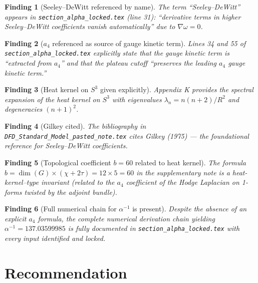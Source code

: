 \documentclass[11pt,a4paper]{article}
\newtheorem{finding}{Finding}
\begin{document}
\begin{finding}[Seeley--DeWitt referenced by name]
The term ``Seeley--DeWitt'' appears in \texttt{section\_alpha\_locked.tex}
(line 31): ``derivative terms in higher Seeley--DeWitt coefficients vanish
automatically'' due to $\nabla\omega = 0$.
\end{finding}

\begin{finding}[$a_4$ referenced as source of gauge kinetic term]
Lines 34 and 55 of \texttt{section\_alpha\_locked.tex} explicitly state that
the gauge kinetic term is ``extracted from $a_4$'' and that the plateau cutoff
``preserves the leading $a_4$ gauge kinetic term.''
\end{finding}

\begin{finding}[Heat kernel on $S^3$ given explicitly]
Appendix K provides the spectral expansion of the heat kernel on $S^3$
with eigenvalues $\lambda_n = n(n+2)/R^2$ and degeneracies $(n+1)^2$.
\end{finding}

\begin{finding}[Gilkey cited]
The bibliography in \texttt{DFD\_Standard\_Model\_pasted\_note.tex} cites
Gilkey (1975) --- the foundational reference for Seeley--DeWitt coefficients.
\end{finding}

\begin{finding}[Topological coefficient $b = 60$ related to heat kernel]
The formula $b = \dim(G) \times (\chi + 2\tau) = 12 \times 5 = 60$ in the
supplementary note is a heat-kernel--type invariant (related to the $a_4$
coefficient of the Hodge Laplacian on 1-forms twisted by the adjoint bundle).
\end{finding}

\begin{finding}[Full numerical chain for $\alpha^{-1}$ is present]
Despite the absence of an explicit $a_4$ formula, the complete numerical
derivation chain yielding $\alpha^{-1} = 137.03599985$ is fully documented
in \texttt{section\_alpha\_locked.tex} with every input identified and locked.
\end{finding}

\section{Recommendation}
\end{document}
